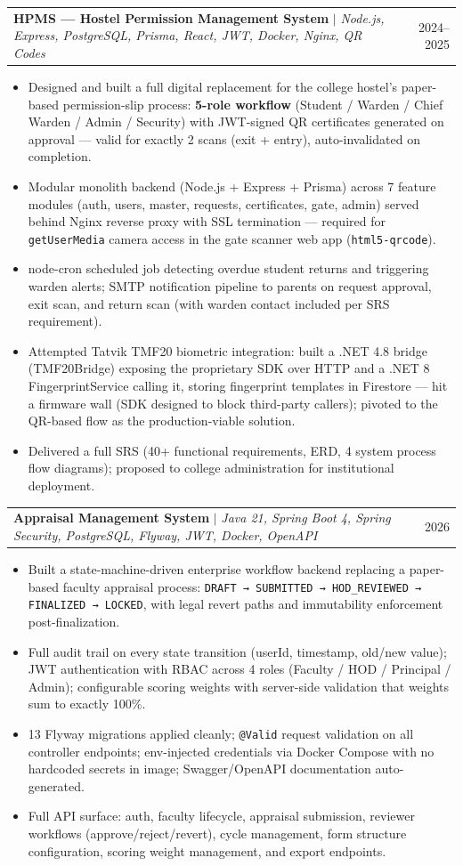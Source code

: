 \documentclass[letterpaper,10pt]{article}
\makeatletter
\newcommand{\resumeItem}[1]{
  \item\small{{#1 \vspace{-2pt}}}
}
\newcommand{\resumeProjectHeading}[2]{
    \item
    \begin{tabular*}{0.97\textwidth}{l@{\extracolsep{\fill}}r}
      \small#1 & \small#2 \\
    \end{tabular*}\vspace{-7pt}
}
\newcommand{\resumeItemListStart}{\begin{itemize}[leftmargin=0.2in, itemsep=-1pt, topsep=0pt]}
\newcommand{\resumeItemListEnd}{\end{itemize}\vspace{-4pt}}
\makeatother
\begin{document}
  \resumeProjectHeading
    {\textbf{HPMS — Hostel Permission Management System} $|$ \textit{Node.js, Express, PostgreSQL, Prisma, React, JWT, Docker, Nginx, QR Codes}}{2024--2025}
  \resumeItemListStart
    \resumeItem{Designed and built a full digital replacement for the college hostel's paper-based permission-slip process: \textbf{5-role workflow} (Student / Warden / Chief Warden / Admin / Security) with JWT-signed QR certificates generated on approval — valid for exactly 2 scans (exit + entry), auto-invalidated on completion.}
    \resumeItem{Modular monolith backend (Node.js + Express + Prisma) across 7 feature modules (auth, users, master, requests, certificates, gate, admin) served behind Nginx reverse proxy with SSL termination — required for \texttt{getUserMedia} camera access in the gate scanner web app (\texttt{html5-qrcode}).}
    \resumeItem{node-cron scheduled job detecting overdue student returns and triggering warden alerts; SMTP notification pipeline to parents on request approval, exit scan, and return scan (with warden contact included per SRS requirement).}
    \resumeItem{Attempted Tatvik TMF20 biometric integration: built a .NET 4.8 bridge (TMF20Bridge) exposing the proprietary SDK over HTTP and a .NET 8 FingerprintService calling it, storing fingerprint templates in Firestore — hit a firmware wall (SDK designed to block third-party callers); pivoted to the QR-based flow as the production-viable solution.}
    \resumeItem{Delivered a full SRS (40+ functional requirements, ERD, 4 system process flow diagrams); proposed to college administration for institutional deployment.}
  \resumeItemListEnd

  \resumeProjectHeading
    {\textbf{Appraisal Management System} $|$ \textit{Java 21, Spring Boot 4, Spring Security, PostgreSQL, Flyway, JWT, Docker, OpenAPI}}{2026}
  \resumeItemListStart
    \resumeItem{Built a state-machine-driven enterprise workflow backend replacing a paper-based faculty appraisal process: \texttt{DRAFT → SUBMITTED → HOD\_REVIEWED → FINALIZED → LOCKED}, with legal revert paths and immutability enforcement post-finalization.}
    \resumeItem{Full audit trail on every state transition (userId, timestamp, old/new value); JWT authentication with RBAC across 4 roles (Faculty / HOD / Principal / Admin); configurable scoring weights with server-side validation that weights sum to exactly 100\%.}
    \resumeItem{13 Flyway migrations applied cleanly; \texttt{@Valid} request validation on all controller endpoints; env-injected credentials via Docker Compose with no hardcoded secrets in image; Swagger/OpenAPI documentation auto-generated.}
    \resumeItem{Full API surface: auth, faculty lifecycle, appraisal submission, reviewer workflows (approve/reject/revert), cycle management, form structure configuration, scoring weight management, and export endpoints.}
  \resumeItemListEnd
\end{document}
